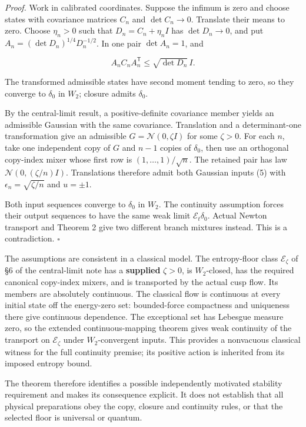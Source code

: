 \documentclass[11pt,a4paper]{article}
\begin{document}
\emph{Proof.} Work in calibrated coordinates. Suppose the infimum is
zero and choose states with covariance matrices \(C_n\) and
\(\det C_n\to0\). Translate their means to zero. Choose \(\eta_n>0\)
such that \(D_n=C_n+\eta_n I\) has \(\det D_n\to0\), and put
\(A_n=(\det D_n)^{1/4}D_n^{-1/2}\). In one pair \(\det A_n=1\), and

\[
 A_nC_nA_n^{\mathsf T}\le\sqrt{\det D_n}\,I. \tag{12a}
\]

The transformed admissible states have second moment tending to zero, so
they converge to \(\delta_0\) in \(W_2\); closure admits \(\delta_0\).

By the central-limit result, a positive-definite covariance member
yields an admissible Gaussian with the same covariance. Translation and
a determinant-one transformation give an admissible
\(G=\mathcal N(0,\zeta I)\) for some \(\zeta>0\). For each \(n\), take
one independent copy of \(G\) and \(n-1\) copies of \(\delta_0\), then
use an orthogonal copy-index mixer whose first row is
\((1,\ldots,1)/\sqrt n\). The retained pair has law
\(\mathcal N(0,(\zeta/n)I)\). Translations therefore admit both Gaussian
inputs (5) with \(\epsilon_n=\sqrt{\zeta/n}\) and \(u=\pm1\).

Both input sequences converge to \(\delta_0\) in \(W_2\). The continuity
assumption forces their output sequences to have the same weak limit
\(\mathcal E_t\delta_0\). Actual Newton transport and Theorem 2 give two
different branch mixtures instead. This is a contradiction. \(\square\)

The assumptions are consistent in a classical model. The entropy-floor
class \(\mathcal E_\zeta\) of §6 of the central-limit note has a
\textbf{supplied} \(\zeta>0\), is \(W_2\)-closed, has the required
canonical copy-index mixers, and is transported by the actual cusp flow.
Its members are absolutely continuous. The classical flow is continuous
at every initial state off the energy-zero set: bounded-force
compactness and uniqueness there give continuous dependence. The
exceptional set has Lebesgue measure zero, so the extended
continuous-mapping theorem gives weak continuity of the transport on
\(\mathcal E_\zeta\) under \(W_2\)-convergent inputs. This provides a
nonvacuous classical witness for the full continuity premise; its
positive action is inherited from its imposed entropy bound.

The theorem therefore identifies a possible independently motivated
stability requirement and makes its consequence explicit. It does not
establish that all physical preparations obey the copy, closure and
continuity rules, or that the selected floor is universal or quantum.
\end{document}

